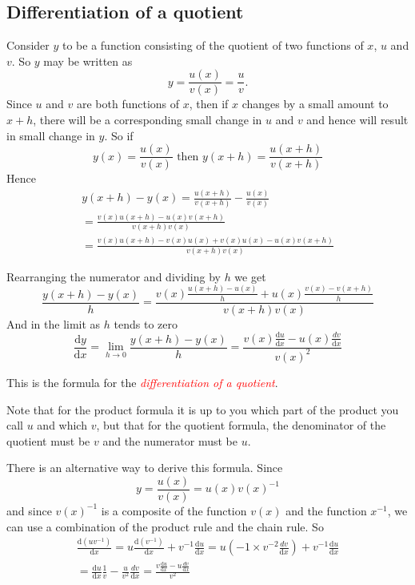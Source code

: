 \documentclass[
  11pt,
  oneside]{book}
\newcommand{\slide}{}
\theoremstyle{definition}
\theoremstyle{definition}
\theoremstyle{definition}
\theoremstyle{definition}
\theoremstyle{remark}
\begin{document}
\slide

\subsection{Differentiation of a quotient}\label{differentiation-of-a-quotient}

Consider \(y\) to be a function consisting of the quotient of two functions of \(x\), \(u\) and \(v\). So \(y\) may be written as
\[
y = \frac{u(x)}{v(x)} = \frac{u}{v}.
\]
Since \(u\) and \(v\) are both functions of \(x\), then if \(x\) changes by a small amount to \(x + h\), there will be a corresponding small change in \(u\) and \(v\) and hence will result in small change in \(y\).
So if
\[
y(x) = \frac{u(x)}{v(x)} \text{ then } y(x+h) = \frac{u(x+h)}{v(x+h)}
\]
Hence
\begin{gather*}
y(x+h)-y(x) = \frac{u(x+h)}{v(x+h)} - \frac{u(x)}{v(x)}\\
=\frac{v(x)u(x+h)-u(x)v(x+h)}{v(x+h)v(x)}\\
=\frac{v(x)u(x+h)-v(x)u(x)+v(x)u(x)-u(x)v(x+h)}{v(x+h)v(x)}
\end{gather*}
\slide
Rearranging the numerator and dividing by \(h\) we get
\[
\frac{y(x+h)-y(x)}{h} = \frac{v(x)\frac{u(x+h)-u(x)}{h}+u(x)\frac{v(x)-v(x+h)}{h}}{v(x+h)v(x)}
\]
And in the limit as \(h\) tends to zero
\[\frac{\mathrm{d} y}{\mathrm{d} x} = \lim\limits_{h\to0}\frac{y(x+h)-y(x)}{h} = \frac{v(x)\frac{\mathrm{d} u}{\mathrm{d} x} - u(x)\frac{dv}{\mathrm{d} x}}{v(x)^2}
\]

This is the formula for the \textcolor{red}{\em differentiation of a quotient}.

Note that for the product formula it is up to you which part of the product you call \(u\) and which \(v\), but that for the quotient formula, the denominator of the quotient must be \(v\) and the numerator must be \(u\).
\slide

There is an alternative way to derive this formula. Since
\[
y = \frac{u(x)}{v(x)} = u(x)v(x)^{-1}
\]
and since \(v(x)^{-1}\) is a composite of the function \(v(x)\) and the function \(x^{-1}\), we can use a combination of the product rule and the chain rule. So
\begin{gather*}
\frac{\mathrm{d}(uv^{-1})}{\mathrm{d} x} = u\frac{\mathrm{d}(v^{-1})}{\mathrm{d} x}+v^{-1}\frac{\mathrm{d} u}{\mathrm{d} x} = u\left(-1\times v^{-2}\frac{dv}{\mathrm{d} x}\right) + v^{-1}\frac{\mathrm{d} u}{\mathrm{d} x}\\
= \frac{\mathrm{d} u}{\mathrm{d} x}\frac{1}{v} - \frac{u}{v^2}\frac{dv}{\mathrm{d} x} = \frac{v\frac{\mathrm{d} u}{\mathrm{d} x}-u\frac{dv}{\mathrm{d} x}}{v^2}
\end{gather*}
\slide
\end{document}
